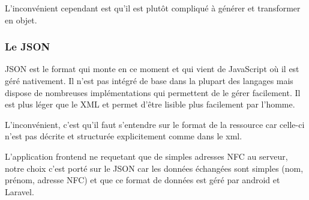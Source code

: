 L'inconvénient cependant est qu'il est plutôt compliqué à générer et transformer
en objet.

\subsubsection{Le JSON}

JSON est le format qui monte en ce moment et qui vient de JavaScript où il est géré
nativement. Il n'est pas intégré de base dans la plupart des langages mais dispose
de nombreuses implémentations qui permettent de le gérer facilement. Il est plus
léger que le XML et permet d'être lisible plus facilement par l'homme.

L'inconvénient, c'est qu'il faut s'entendre sur le format de la ressource car celle-ci
n'est pas décrite et structurée explicitement comme dans le xml.

L'application frontend ne requetant que de simples adresses NFC au serveur, notre
choix c'est porté sur le JSON car les données échangées sont simples (nom, prénom,
adresse NFC) et que ce format de données est géré par android et Laravel.
